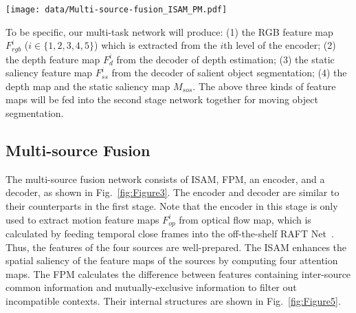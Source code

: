 \documentclass[sigconf]{acmart}
\begin{document}
\begin{figure*}
\texttt{[image: data/Multi-source-fusion\_ISAM\_PM.pdf]}
        \centering
        \caption{Detailed diagram of interoceptive spatial attention module (ISAM) and feature purification module (FPM).}
\label{fig:Figure5}
\end{figure*} 
To be specific, our multi-task network will produce: (1) the RGB feature map $F_{rgb}^i$ ($i\in\{1, 2, 3, 4, 5\}$) which is extracted from the $i$th level of the encoder; (2) the depth feature map $F_{d}^i$  from the decoder of depth estimation; (3) the static saliency feature map $F_{ss}^i$ from the decoder of salient object segmentation; (4) the depth map and the static saliency map $M_{sos}$.  The above three kinds of feature maps will be fed into the second stage network together for moving object segmentation. 









\subsection{Multi-source Fusion}


The multi-source fusion network consists of ISAM, FPM, an encoder, and a decoder, as shown in Fig.~\ref{fig:Figure3}. The encoder and decoder are similar to their counterparts in the first stage. Note that the encoder in this stage is only used to extract motion feature maps $F_{op}^i$  from optical flow map, which is calculated by feeding temporal close frames into the off-the-shelf RAFT Net~\cite{RAFT}. Thus, the features of the four sources are well-prepared. The ISAM enhances the spatial saliency of the feature maps of the sources by computing four attention maps. The FPM calculates the difference between features containing inter-source common information and mutually-exclusive information to filter out incompatible contexts. Their internal structures are shown in Fig.~\ref{fig:Figure5}.  
\end{document}
